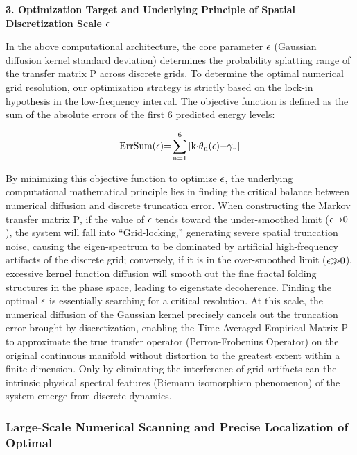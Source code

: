 \documentclass[fleqn,10pt]{wlscirep}
\begin{document}
\textbf{3. Optimization Target and Underlying Principle of Spatial
Discretization Scale} \(\text{\ensuremath{\epsilon}}\)

In the above computational architecture, the core parameter \(\text{\ensuremath{\epsilon}}\)
(Gaussian diffusion kernel standard deviation) determines the
probability splatting range of the transfer matrix \(\text{P}\) across
discrete grids. To determine the optimal numerical grid resolution, our
optimization strategy is strictly based on the lock-in hypothesis in the
low-frequency interval. The objective function is defined as the sum of
the absolute errors of the first 6 predicted energy levels:

\[\text{ErrSum(\ensuremath{\epsilon})=}\sum_{\text{n}\text{=1}}^{\text{6}}\text{|}\text{k}\text{\ensuremath{\cdot}}\text{\ensuremath{\theta}}_{\text{n}}\text{(\ensuremath{\epsilon})\ensuremath{-}}\text{\ensuremath{\gamma}}_{\text{n}}\text{|}\]

By minimizing this objective function to optimize \(\text{\ensuremath{\epsilon}}\), the
underlying computational mathematical principle lies in finding the
critical balance between numerical diffusion and discrete truncation
error. When constructing the Markov transfer matrix \(\text{P}\), if the
value of \(\text{\ensuremath{\epsilon}}\) tends toward the under-smoothed limit
(\(\text{\ensuremath{\epsilon}\ensuremath{\rightarrow}0}\)), the system will fall into ``Grid-locking,'' generating
severe spatial truncation noise, causing the eigen-spectrum to be
dominated by artificial high-frequency artifacts of the discrete grid;
conversely, if it is in the over-smoothed limit (\(\text{\ensuremath{\epsilon}\ensuremath{\gg}0}\)),
excessive kernel function diffusion will smooth out the fine fractal
folding structures in the phase space, leading to eigenstate
decoherence. Finding the optimal \(\text{\ensuremath{\epsilon}}\) is essentially searching
for a critical resolution. At this scale, the numerical diffusion of the
Gaussian kernel precisely cancels out the truncation error brought by
discretization, enabling the Time-Averaged Empirical Matrix \(\text{P}\)
to approximate the true transfer operator (Perron-Frobenius Operator) on
the original continuous manifold without distortion to the greatest
extent within a finite dimension. Only by eliminating the interference
of grid artifacts can the intrinsic physical spectral features (Riemann
isomorphism phenomenon) of the system emerge from discrete dynamics.

\subsubsection*{Large-Scale Numerical Scanning and Precise Localization of Optimal}
\end{document}
